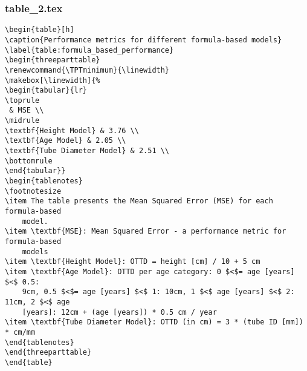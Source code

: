 \documentclass[11pt]{article}
\begin{document}
\subsubsection*{table\_2.tex}

\begin{Verbatim}[tabsize=4]
\begin{table}[h]
\caption{Performance metrics for different formula-based models}
\label{table:formula_based_performance}
\begin{threeparttable}
\renewcommand{\TPTminimum}{\linewidth}
\makebox[\linewidth]{%
\begin{tabular}{lr}
\toprule
 & MSE \\
\midrule
\textbf{Height Model} & 3.76 \\
\textbf{Age Model} & 2.05 \\
\textbf{Tube Diameter Model} & 2.51 \\
\bottomrule
\end{tabular}}
\begin{tablenotes}
\footnotesize
\item The table presents the Mean Squared Error (MSE) for each formula-based
	model.
\item \textbf{MSE}: Mean Squared Error - a performance metric for formula-based
	models
\item \textbf{Height Model}: OTTD = height [cm] / 10 + 5 cm
\item \textbf{Age Model}: OTTD per age category: 0 $<$= age [years] $<$ 0.5:
	9cm, 0.5 $<$= age [years] $<$ 1: 10cm, 1 $<$ age [years] $<$ 2: 11cm, 2 $<$ age
	[years]: 12cm + (age [years]) * 0.5 cm / year
\item \textbf{Tube Diameter Model}: OTTD (in cm) = 3 * (tube ID [mm]) * cm/mm
\end{tablenotes}
\end{threeparttable}
\end{table}

\end{Verbatim}




\end{document}
